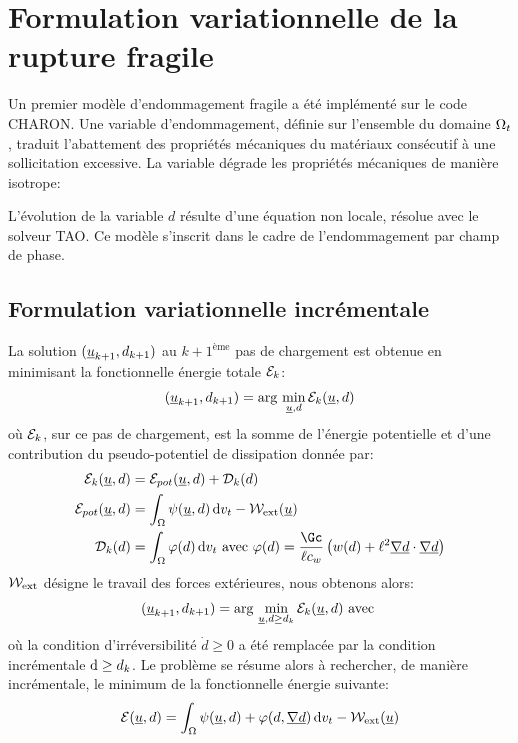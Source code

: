 \documentclass[10pt]{book}
\begin{document}
\section{Formulation variationnelle de la rupture fragile}\label{Section:Ajout de l'endommagement fragile}
Un premier modèle d'endommagement fragile a été implémenté sur le code CHARON. Une variable d'endommagement, définie sur l'ensemble du domaine $\Omega_{t}$, traduit l'abattement des propriétés mécaniques du matériaux consécutif à une sollicitation excessive. La variable dégrade les propriétés mécaniques de manière isotrope:

L'évolution de la variable $d$ résulte d'une équation non locale, résolue avec le solveur TAO. Ce modèle s'inscrit dans le cadre de l'endommagement par champ de phase.
\subsection{Formulation variationnelle incrémentale}
La solution $(\underline{u}_{k+1},d_{k+1})$ au $k+1^{\text{ème}}$ pas de chargement est obtenue en minimisant la fonctionnelle énergie totale $\mathcal{E}_{k}$:
\begin{equation}
(\underline{u}_{k+1},d_{k+1}) = \mathrm{arg}\,\min_{\underline{u},d} \mathcal{E}_{k}(\underline{u},d)
\label{eq:Minimisation_intra}
\end{equation}
où $\mathcal{E}_{k}$, sur ce pas de chargement, est la somme de l'énergie potentielle et d'une contribution du pseudo-potentiel de dissipation donnée par:
\begin{align}
\Etot_{k}(\Dep,d) &= \EPot(\Dep,d)+\mathcal{D}_{k}(d)\\
\EPot(\Dep,d) &=\int_{\Omega} \eHelm(\Dep,d)\dvt-\Wext(\Dep)\\
\mathcal{D}_{k}(d) &= \int_{\Omega}\varphi(d)\dvt
\avec \varphi(d)=\dfrac{\Gc}{\ell c_{w}}\left(w(d)+\ell^{2}\vec{\nabla d}\cdot\vec{\nabla d}\right)
\end{align}
$\mathcal{W}_\mathrm{ext}$ désigne le travail des forces extérieures, nous obtenons alors:
\begin{equation}
(\underline{u}_{k+1},d_{k+1})= \mathrm{arg}\,\min_{\underline{u},d \geq d_{k}} \mathcal{E}_{k}(\underline{u},d) \text{ avec } 
\label{eq:incremental-energy-minimization}
\end{equation}
où la condition d'irréversibilité $\dot{d}\geq 0$ a été remplacée par la condition incrémentale $\mathrm{d} \geq d_{k}$. Le problème se résume alors à rechercher, de manière incrémentale, le minimum de la fonctionnelle énergie suivante:
\begin{equation}
\mathcal{E}(\underline{u},d)=\int_{\Omega}\psi(\underline{u},d)+\varphi(d,\underline{\nabla d}) \,\mathrm{d}v_{t} -\mathcal{W}_\mathrm{ext}(\underline{u})
\label{eq:fonctionnelle_energie_intra}
\end{equation}
\end{document}
